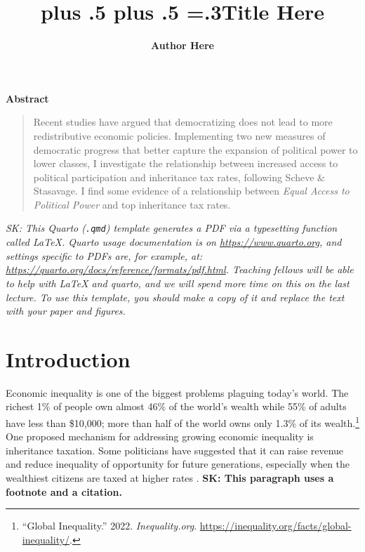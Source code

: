 \documentclass[12pt, ]{article}
\title{\sffamily\bfseries\huge\parfillskip=0pt
\rightskip=0pt plus .5\textwidth
\leftskip=0pt plus .5\textwidth
\emergencystretch=.3\textwidth Title Here}
\author{\textbf{Author Here}
 }
\date{}
\renewenvironment{abstract}{
  \centerline
  {\large\sffamily\bfseries Abstract}\vspace{-1em}
  \begin{quote}\small
}{
  \end{quote}
}
\begin{document}
\allsectionsfont{\sffamily}

\maketitle

\begin{abstract}
Recent studies have argued that democratizing does not lead to more
redistributive economic policies. Implementing two new measures of
democratic progress that better capture the expansion of political power
to lower classes, I investigate the relationship between increased
access to political participation and inheritance tax rates, following
Scheve \& Stasavage. I find some evidence of a relationship between
\emph{Equal Access to Political Power} and top inheritance tax rates.
\end{abstract}

\ifdefined\Shaded\renewenvironment{Shaded}{\begin{tcolorbox}[sharp corners, interior hidden, breakable, frame hidden, borderline west={3pt}{0pt}{shadecolor}, enhanced, boxrule=0pt]}{\end{tcolorbox}}\fi




\emph{SK: This Quarto (\texttt{.qmd}) template generates a PDF via a
typesetting function called LaTeX. Quarto usage documentation is on
\url{https://www.quarto.org}, and settings specific to PDFs are, for
example, at: \url{https://quarto.org/docs/reference/formats/pdf.html}.
Teaching fellows will be able to help with LaTeX and quarto, and we will
spend more time on this on the last lecture. To use this template, you
should make a copy of it and replace the text with your paper and
figures.}

\hypertarget{introduction}{%
\section{Introduction}\label{introduction}}

Economic inequality is one of the biggest problems plaguing today's
world. The richest 1\% of people own almost 46\% of the world's wealth
while 55\% of adults have less than \$10,000; more than half of the
world owns only 1.3\% of its wealth.\footnote{``Global Inequality.''
  2022. \emph{Inequality.org}.
  \url{https://inequality.org/facts/global-inequality/}.} One proposed
mechanism for addressing growing economic inequality is inheritance
taxation. Some politicians have suggested that it can raise revenue and
reduce inequality of opportunity for future generations, especially when
the wealthiest citizens are taxed at higher rates \citep{scheve2012}.
\textbf{SK: This paragraph uses a footnote and a citation.}
\end{document}
